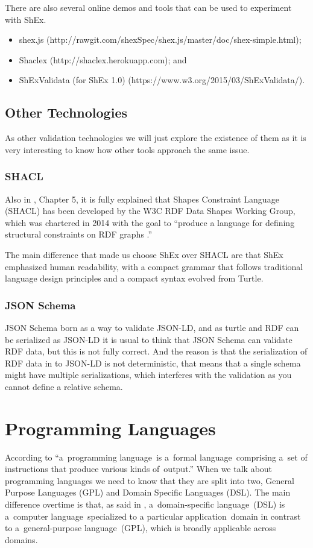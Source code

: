 There are also several online demos and tools that can be used to experiment with ShEx.

\begin{itemize}
	\item shex.js (http://rawgit.com/shexSpec/shex.js/master/doc/shex-simple.html);
	\item Shaclex (http://shaclex.herokuapp.com); and
	\item ShExValidata (for ShEx 1.0) (https://www.w3.org/2015/03/ShExValidata/).
\end{itemize}

\subsection{Other Technologies}
\label{subs:theo-back-validating-other-techs}
As other validation technologies we will just explore the existence of them as it is very interesting to know how
other tools approach the same issue.

\subsubsection{SHACL}
Also in \cite{labra-validating-rdf}, Chapter 5, it is fully explained that Shapes Constraint Language (SHACL)
has been developed by the W3C RDF Data Shapes Working Group, which was chartered in 2014 with the goal to “produce
a language for defining structural constraints on RDF graphs \cite{oslc-resource-shape}.”

The main difference that made us choose ShEx over SHACL are that ShEx emphasized human readability, with a
compact grammar that follows traditional language design principles and a compact syntax evolved from Turtle.

\subsubsection{JSON Schema}
JSON Schema born as a way to validate JSON-LD, and as turtle and RDF can be serialized as JSON-LD it is usual to
think that JSON Schema can validate RDF data, but this is not fully correct. And the reason is that the serialization
of RDF data in to JSON-LD is not deterministic, that means that a single schema might have multiple serializations,
which interferes with the validation as you cannot define a relative schema.


\section{Programming Languages}
According to \cite{programing-language} “a programming language is a formal language comprising a set of instructions
that produce various kinds of output.” When we talk about programming languages we need to know that they are split into
two, General Purpose Languages (GPL) and Domain Specific Languages (DSL). The main difference overtime is that, as said
in \cite{dsl}, a domain-specific language (DSL) is a computer language specialized to a particular application domain
in contrast to a general-purpose language (GPL), which is broadly applicable across domains.

